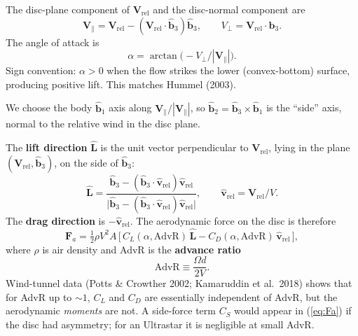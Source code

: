\documentclass[11pt,letterpaper]{article}
\begin{document}
The disc-plane component of $\mathbf{V}_{\text{rel}}$ and the disc-normal component are
\begin{equation}
\mathbf{V}_\parallel = \mathbf{V}_{\text{rel}} - (\mathbf{V}_{\text{rel}} \cdot \hat{\mathbf{b}}_3)\hat{\mathbf{b}}_3, \qquad
V_\perp = \mathbf{V}_{\text{rel}}\cdot\hat{\mathbf{b}}_3.
\end{equation}
The angle of attack is
\begin{equation}
\alpha = \arctan\!\Big(\!-V_\perp / |\mathbf{V}_\parallel|\Big).
\label{eq:alpha}
\end{equation}
Sign convention: $\alpha > 0$ when the flow strikes the lower (convex-bottom) surface, producing positive lift. This matches Hummel (2003).

We choose the body $\hat{\mathbf{b}}_1$ axis along $\mathbf{V}_\parallel/|\mathbf{V}_\parallel|$, so $\hat{\mathbf{b}}_2 = \hat{\mathbf{b}}_3 \times \hat{\mathbf{b}}_1$ is the ``side'' axis, normal to the relative wind in the disc plane.

The \textbf{lift direction} $\hat{\mathbf{L}}$ is the unit vector perpendicular to $\mathbf{V}_{\text{rel}}$, lying in the plane $(\mathbf{V}_{\text{rel}}, \hat{\mathbf{b}}_3)$, on the side of $\hat{\mathbf{b}}_3$:
\begin{equation}
\hat{\mathbf{L}} = \frac{\hat{\mathbf{b}}_3 - (\hat{\mathbf{b}}_3 \cdot \hat{\mathbf{v}}_{\text{rel}})\hat{\mathbf{v}}_{\text{rel}}}{\big|\hat{\mathbf{b}}_3 - (\hat{\mathbf{b}}_3 \cdot \hat{\mathbf{v}}_{\text{rel}})\hat{\mathbf{v}}_{\text{rel}}\big|}, \qquad \hat{\mathbf{v}}_{\text{rel}} = \mathbf{V}_{\text{rel}}/V.
\end{equation}
The \textbf{drag direction} is $-\hat{\mathbf{v}}_{\text{rel}}$. The aerodynamic force on the disc is therefore
\begin{equation}
\mathbf{F}_a = \tfrac{1}{2}\rho V^2 A\,\big[\,C_L(\alpha, \mathrm{AdvR})\,\hat{\mathbf{L}} - C_D(\alpha, \mathrm{AdvR})\,\hat{\mathbf{v}}_{\text{rel}}\,\big],
\label{eq:Fa}
\end{equation}
where $\rho$ is air density and AdvR is the \textbf{advance ratio}
\begin{equation}
\mathrm{AdvR} \equiv \frac{\Omega d}{2 V}.
\label{eq:AdvR}
\end{equation}
Wind-tunnel data (Potts \& Crowther 2002; Kamaruddin et al.\ 2018) shows that for AdvR up to $\sim 1$, $C_L$ and $C_D$ are essentially independent of AdvR, but the aerodynamic \emph{moments} are not. A side-force term $C_S$ would appear in (\ref{eq:Fa}) if the disc had asymmetry; for an Ultrastar it is negligible at small AdvR.
\end{document}
